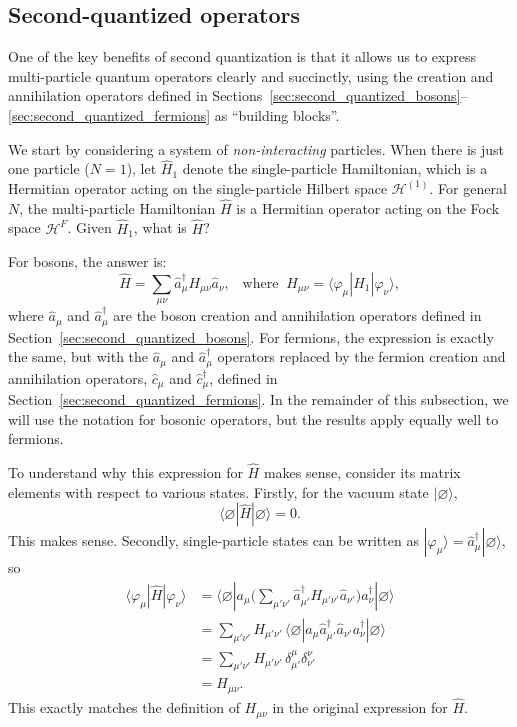 \documentclass[pra,12pt]{revtex4}
\begin{document}
\subsection{Second-quantized operators}
\label{sec:second_quant_op}

One of the key benefits of second quantization is that it allows us to
express multi-particle quantum operators clearly and succinctly, using
the creation and annihilation operators defined in
Sections~\ref{sec:second_quantized_bosons}--\ref{sec:second_quantized_fermions}
as ``building blocks''.

We start by considering a system of \textit{non-interacting}
particles.  When there is just one particle ($N=1$), let $\hat{H}_1$
denote the single-particle Hamiltonian, which is a Hermitian operator
acting on the single-particle Hilbert space $\mathscr{H}^{(1)}$.  For
general $N$, the multi-particle Hamiltonian $\hat{H}$ is a Hermitian
operator acting on the Fock space $\mathscr{H}^F$.  Given $\hat{H}_1$,
what is $\hat{H}$?

For bosons, the answer is:
$$\hat{H} = \sum_{\mu\nu} \hat{a}^\dagger_\mu H_{\mu\nu} \hat{a}_\nu, \;\;\; \mathrm{where}\;\; H_{\mu\nu} = \langle\varphi_\mu|\hat{H}_1|\varphi_\nu\rangle,$$
where $\hat{a}_\mu$ and $\hat{a}_\mu^\dagger$ are the boson creation
and annihilation operators defined in
Section~\ref{sec:second_quantized_bosons}.  For fermions, the
expression is exactly the same, but with the $\hat{a}_\mu$ and
$\hat{a}_\mu^\dagger$ operators replaced by the fermion creation and
annihilation operators, $\hat{c}_\mu$ and $\hat{c}_\mu^\dagger$,
defined in Section~\ref{sec:second_quantized_fermions}.  In the
remainder of this subsection, we will use the notation for bosonic
operators, but the results apply equally well to fermions.

To understand why this expression for $\hat{H}$ makes sense, consider
its matrix elements with respect to various states.  Firstly, for the
vacuum state $|\varnothing\rangle$,
$$\langle\varnothing|\hat{H}|\varnothing\rangle = 0.$$
This makes sense. Secondly, single-particle states can be written as
$|\varphi_\mu\rangle = \hat{a}^\dagger_\mu|\varnothing\rangle$, so
$$\begin{aligned}\langle\varphi_\mu|\hat{H}|\varphi_\nu\rangle &= \langle\varnothing|a_\mu \Big(\sum_{\mu'\nu'} \hat{a}^\dagger_{\mu'} H_{\mu'\nu'} \hat{a}_{\nu'}\Big) a_\nu^\dagger |\varnothing\rangle \\ &= \sum_{\mu'\nu'} H_{\mu'\nu'} \, \langle\varnothing|a_\mu \hat{a}^\dagger_{\mu'}  \hat{a}_{\nu'} a_\nu^\dagger |\varnothing\rangle \\ &= \sum_{\mu'\nu'} H_{\mu'\nu'} \, \delta^{\mu}_{\mu'} \delta^{\nu}_{\nu'} \\&= H_{\mu\nu}.\end{aligned}$$
This exactly matches the definition of $H_{\mu\nu}$ in the original
expression for $\hat{H}$.
\end{document}

